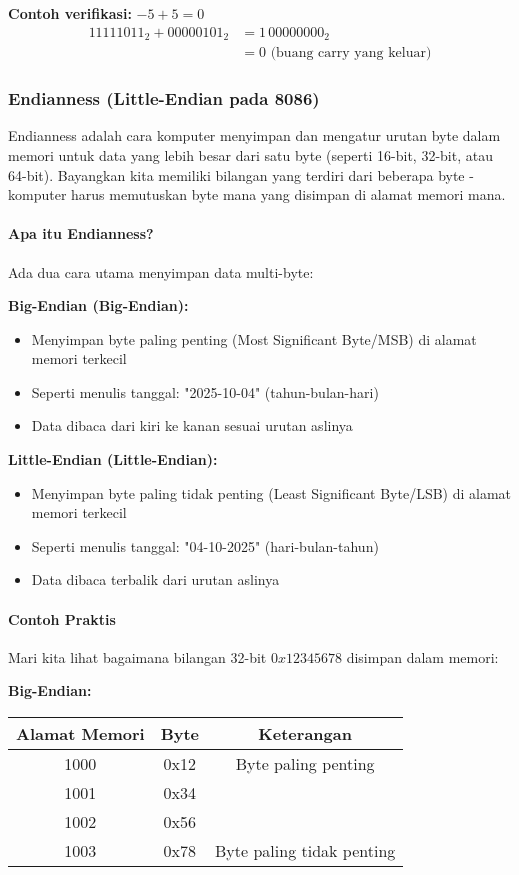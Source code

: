 \textbf{Contoh verifikasi:} \(-5 + 5 = 0\)
\begin{align}
11111011_2 + 00000101_2 &= 1\,00000000_2 \\
&= 0 \text{ (buang carry yang keluar)}
\end{align}

\subsubsection{Endianness (Little-Endian pada 8086)}

Endianness adalah cara komputer menyimpan dan mengatur urutan byte dalam memori untuk data yang lebih besar dari satu byte (seperti 16-bit, 32-bit, atau 64-bit). Bayangkan kita memiliki bilangan yang terdiri dari beberapa byte - komputer harus memutuskan byte mana yang disimpan di alamat memori mana.

\paragraph{Apa itu Endianness?}
Ada dua cara utama menyimpan data multi-byte:

\textbf{Big-Endian (Big-Endian):}
\begin{itemize}
    \item Menyimpan byte paling penting (Most Significant Byte/MSB) di alamat memori terkecil
    \item Seperti menulis tanggal: "2025-10-04" (tahun-bulan-hari)
    \item Data dibaca dari kiri ke kanan sesuai urutan aslinya
\end{itemize}

\textbf{Little-Endian (Little-Endian):}
\begin{itemize}
    \item Menyimpan byte paling tidak penting (Least Significant Byte/LSB) di alamat memori terkecil
    \item Seperti menulis tanggal: "04-10-2025" (hari-bulan-tahun)
    \item Data dibaca terbalik dari urutan aslinya
\end{itemize}

\paragraph{Contoh Praktis}
Mari kita lihat bagaimana bilangan 32-bit \(0x12345678\) disimpan dalam memori:

\textbf{Big-Endian:}
\begin{center}
\begin{tabular}{|c|c|c|}
\hline
\textbf{Alamat Memori} & \textbf{Byte} & \textbf{Keterangan} \\
\hline
1000 & 0x12 & Byte paling penting \\
1001 & 0x34 & \\
1002 & 0x56 & \\
1003 & 0x78 & Byte paling tidak penting \\
\hline
\end{tabular}
\end{center}


